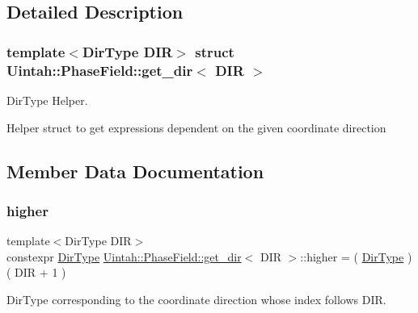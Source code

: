 \subsection{Detailed Description}
\subsubsection*{template$<$Dir\+Type D\+IR$>$\newline
struct Uintah\+::\+Phase\+Field\+::get\+\_\+dir$<$ D\+I\+R $>$}

Dir\+Type Helper. 

Helper struct to get expressions dependent on the given coordinate direction 

\subsection{Member Data Documentation}
\mbox{\label{structUintah_1_1PhaseField_1_1get__dir_a04063dff326643b6ca4262b753de1c8b}} 
\subsubsection{\texorpdfstring{higher}{higher}}
{\footnotesize\ttfamily template$<$Dir\+Type D\+IR$>$ \\
constexpr \hyperlink{namespaceUintah_1_1PhaseField_a94555da848596a419ae2c0e32649e1dc}{Dir\+Type} \hyperlink{structUintah_1_1PhaseField_1_1get__dir}{Uintah\+::\+Phase\+Field\+::get\+\_\+dir}$<$ D\+IR $>$\+::higher = ( \hyperlink{namespaceUintah_1_1PhaseField_a94555da848596a419ae2c0e32649e1dc}{Dir\+Type} ) ( D\+IR + 1 )\hspace{0.3cm}{\ttfamily [static]}}



Dir\+Type corresponding to the coordinate direction whose index follows D\+IR. 

\mbox{\label{structUintah_1_1PhaseField_1_1get__dir_a210b10609a865b8f542e78e0d2ba38b0}} 

